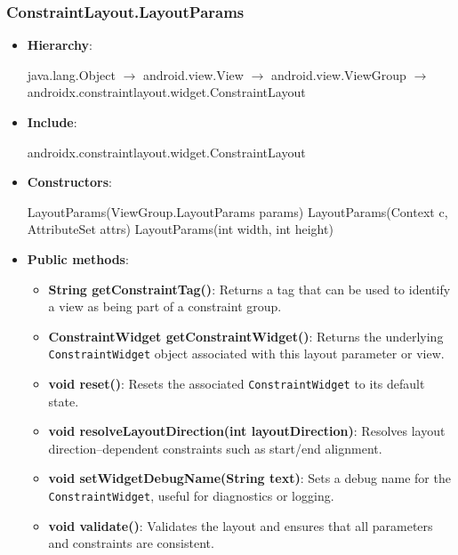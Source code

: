 \documentclass{report}
\begin{document}
    \subsubsection{ConstraintLayout.LayoutParams}
    \begin{itemize}
        \item \textbf{Hierarchy}: 
            \begin{center}
                java.lang.Object $\to $	android.view.View $\to $	android.view.ViewGroup $\to $	androidx.constraintlayout.widget.ConstraintLayout
            \end{center}
        \item \textbf{Include}:
            \bigbreak \noindent 
            \begin{javacode}
            androidx.constraintlayout.widget.ConstraintLayout
            \end{javacode}
        \item \textbf{Constructors}:
            \bigbreak \noindent 
            \begin{javacode}
                LayoutParams(ViewGroup.LayoutParams params)
                LayoutParams(Context c, AttributeSet attrs)
                LayoutParams(int width, int height)
            \end{javacode}
        \item \textbf{Public methods}:
            \begin{itemize}
                \item \textbf{String getConstraintTag()}: Returns a tag that can be used to identify a view as being part of a constraint group.
                \item \textbf{ConstraintWidget getConstraintWidget()}: Returns the underlying \texttt{ConstraintWidget} object associated with this layout parameter or view.
                \item \textbf{void reset()}: Resets the associated \texttt{ConstraintWidget} to its default state.
                \item \textbf{void resolveLayoutDirection(int layoutDirection)}: Resolves layout direction–dependent constraints such as start/end alignment.
                \item \textbf{void setWidgetDebugName(String text)}: Sets a debug name for the \texttt{ConstraintWidget}, useful for diagnostics or logging.
                \item \textbf{void validate()}: Validates the layout and ensures that all parameters and constraints are consistent.

\end{itemize}
\end{itemize}
\end{document}
